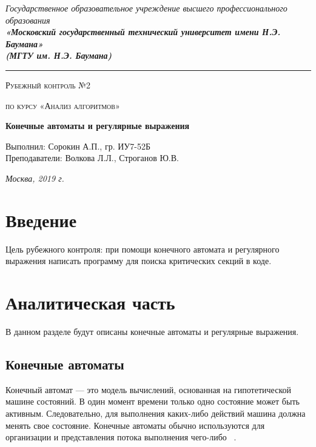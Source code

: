 \documentclass[12pt, a4paper]{report}
\begin{document}
    \begin{titlepage}

        \begin{center}
            \Large
            {\sl Государственное образовательное учреждение высшего профессионального образования\\
            {\bf«Московский государственный технический университет имени Н.Э. Баумана»\\
				(МГТУ им. Н.Э. Баумана)}}
				\noindent\rule{\textwidth}{2pt}
            \vspace{3cm}

			{\scshape\LARGE Рубежный контроль №2 \par}
			\vspace{0.5cm}	
			{\scshape\LARGE по курсу «Анализ алгоритмов» \par}
			\vspace{1.5cm}
			{\huge\bfseries Конечные автоматы и регулярные выражения \par}
			\vspace{2cm}
			\Large Выполнил: Сорокин А.П., гр. ИУ7-52Б\\
			\vspace{0.5cm}
			{\Large Преподаватели: Волкова Л.Л., Строганов Ю.В.}
		
			\vfill
			\Large \textit {Москва, 2019 г.}
            
        \end{center}

    \end{titlepage}
	
	\tableofcontents

	\chapter*{Введение}
	\hspace{0.5cm}Цель рубежного контроля: при помощи конечного автомата и регулярного выражения
	написать программу для поиска критических секций в коде.

    \chapter{Аналитическая часть}
	\hspace{0.5cm}В данном разделе будут описаны конечные автоматы и регулярные выражения.
	
	\section{Конечные автоматы}
	\hspace{0.5cm}Конечный автомат — это модель вычислений, основанная на гипотетической машине состояний. В один момент времени только одно состояние может быть активным. Следовательно, для выполнения каких-либо действий машина должна менять свое состояние. Конечные автоматы обычно используются для организации и представления потока выполнения чего-либо ~\cite{ka}.
	
\end{document}

